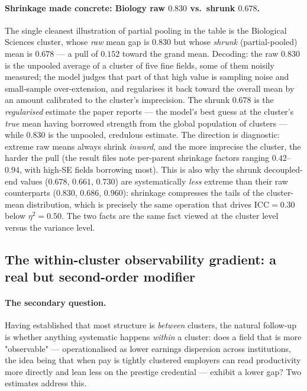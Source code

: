 \documentclass[11pt]{article}
\begin{document}
\paragraph{Shrinkage made concrete: Biology raw $0.830$ vs.\ shrunk $0.678$.} The single cleanest illustration of partial pooling in the table is the Biological Sciences cluster, whose \emph{raw} mean gap is $0.830$ but whose \emph{shrunk} (partial-pooled) mean is $0.678$ --- a pull of $0.152$ toward the grand mean. Decoding: the raw $0.830$ is the unpooled average of a cluster of five fine fields, some of them noisily measured; the model judges that part of that high value is sampling noise and small-sample over-extension, and regularises it back toward the overall mean by an amount calibrated to the cluster's imprecision. The shrunk $0.678$ is the \emph{regularised} estimate the paper reports --- the model's best guess at the cluster's \emph{true} mean having borrowed strength from the global population of clusters --- while $0.830$ is the unpooled, credulous estimate. The direction is diagnostic: extreme raw means always shrink \emph{inward}, and the more imprecise the cluster, the harder the pull (the result files note per-parent shrinkage factors ranging $0.42$--$0.94$, with high-SE fields borrowing most). This is also why the shrunk decoupled-end values ($0.678$, $0.661$, $0.730$) are systematically \emph{less} extreme than their raw counterparts ($0.830$, $0.686$, $0.960$): shrinkage compresses the tails of the cluster-mean distribution, which is precisely the same operation that drives $\mathrm{ICC}=0.30$ below $\eta^2=0.50$. The two facts are the same fact viewed at the cluster level versus the variance level.

\subsection{The within-cluster observability gradient: a real but second-order modifier}

\paragraph{The secondary question.} Having established that most structure is \emph{between} clusters, the natural follow-up is whether anything systematic happens \emph{within} a cluster: does a field that is more "observable" --- operationalised as lower earnings dispersion across institutions, the idea being that when pay is tightly clustered employers can read productivity more directly and lean less on the prestige credential --- exhibit a lower gap? Two estimates address this.
\end{document}
